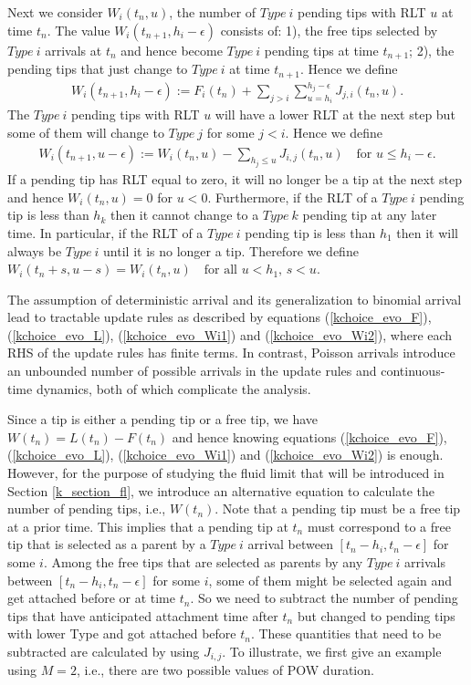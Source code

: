 \documentclass[12pt]{article}
\numberwithin{equation}{section}  %
\begin{document}
Next we consider $W_i(t_{n}, u)$, the number of {$Type\ i$} pending tips with RLT $u$ at time $t_n$. The value $W_i(t_{n+1}, h_i-\epsilon)$ consists of: 1), the free tips selected by {$Type\ i$} arrivals at $t_{n}$ and hence become {$Type\ i$} pending tips at time $t_{n+1}$; 2), the pending tips that just change to {$Type\ i$} at time $t_{n+1}$. Hence we define
\begin{align}
W_i(t_{n+1}, h_i-\epsilon) :=F_i(t_n)+\sum_{j>i}\sum_{u=h_i}^{h_j-\epsilon} J_{j,i}(t_n,u).\label{kchoice_evo_Wi1}
\end{align}
The {$Type\ i$} pending tips with RLT $u$ will have a lower RLT at the next step but some of them will change to {$Type\ j$} for some $j<i$. Hence we define 
\begin{align}
W_i(t_{n+1}, u - \epsilon) := W_i(t_{n}, u) - \sum_{h_j\leq u}J_{i,j}(t_n, u)\quad\text{for }{u\leq h_i-\epsilon}.\label{kchoice_evo_Wi2}
\end{align}
If a pending tip has RLT equal to zero, it will no longer be a tip at the next step and hence ${W}_i(t_n, u)=0$ for $u<0$. Furthermore, if the RLT of a {$Type\ i$} pending tip is less than 
$h_k$ then it cannot change to a {$Type\ k$} pending tip at any later time. In particular, if the RLT of a {$Type\ i$} pending tip is less than $h_1$ then it will always be {$Type\ i$} until it is no longer a tip. Therefore we define $W_i(t_n + s, u-s) = W_i(t_n, u) \quad \text{for all $u<h_1$, $s<u$}$.

The assumption of deterministic arrival and its generalization to binomial arrival lead to tractable update rules as described by equations (\ref{kchoice_evo_F}), (\ref{kchoice_evo_L}), (\ref{kchoice_evo_Wi1}) and (\ref{kchoice_evo_Wi2}), where each RHS of the update rules has finite terms. In contrast, Poisson arrivals introduce an unbounded number of possible arrivals in the update rules and continuous-time dynamics, both of which complicate the analysis.

Since a tip is either a pending tip or a free tip, we have $W(t_n)=L(t_n)-F(t_n)$ and hence knowing equations (\ref{kchoice_evo_F}), (\ref{kchoice_evo_L}), (\ref{kchoice_evo_Wi1}) and (\ref{kchoice_evo_Wi2}) is enough. However, for the purpose of studying the fluid limit that will be introduced in Section \ref{k_section_fl}, we introduce an alternative equation to calculate the number of pending tips, i.e., $W(t_n)$. Note that a pending tip must be a free tip at a prior time. This implies that a pending tip at $t_n$ must correspond to a free tip that is selected as a parent by a {$Type\ i$} arrival between $[t_n-h_i,t_n-\epsilon]$ for some $i$. Among the free tips that are selected as parents by any {$Type\ i$} arrivals between $[t_n-h_i,t_n-\epsilon]$ for some $i$, some of them might be selected again and get attached before or at time $t_n$. So we need to subtract the number of pending tips that have anticipated attachment time after $t_n$ but changed to pending tips with lower Type and got attached before $t_n$. These quantities that need to be subtracted are calculated by using $J_{i,j}$. To illustrate, we first give an example using $M=2$, i.e., there are two possible values of POW duration.
\end{document}
